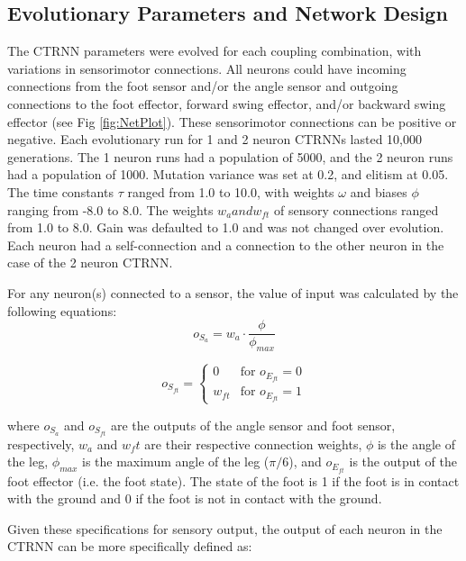 \documentclass{article}
\begin{document}
\subsection{Evolutionary Parameters and Network Design} The CTRNN parameters were evolved for each coupling combination, with variations in sensorimotor connections. All neurons could have incoming connections from the foot sensor and/or the angle sensor and outgoing connections to the foot effector, forward swing effector, and/or backward swing effector (see Fig \ref{fig:NetPlot}). These sensorimotor connections can be positive or negative. 
Each evolutionary run for 1 and 2 neuron CTRNNs lasted 10,000 generations. The 1 neuron runs had a population of 5000, and the 2 neuron runs had a population of 1000. Mutation variance was set at 0.2, and elitism at 0.05. The time constants \(\tau\) ranged from 1.0 to 10.0, with weights \(\omega\) and biases \(\phi\) ranging from -8.0 to 8.0. The weights \(w_a and w_{ft}\) of sensory connections ranged from 1.0 to 8.0. Gain was defaulted to 1.0 and was not changed over evolution. Each neuron had a self-connection and a connection to the other neuron in the case of the 2 neuron CTRNN.




For any neuron(s) connected to a sensor, the value of input was calculated by the following equations:
\begin{equation}
o_{S_{a}} = w_a \cdot \frac{ \phi  }{ \phi_{max} }
\end{equation}

\begin{equation}
o_{S_{ft}} = 
\begin{cases} 
0 & \text{for } o_{{E}_{ft}} = 0 \\
w_{ft} & \text{for } o_{{E}_{ft}} = 1
\end{cases}
\end{equation}

where \(o_{S_{a}}\) and \(o_{S_{ft}}\) are the outputs of the angle sensor and foot sensor, respectively, \(w_a\) and \(w_ft\) are their respective connection weights, \(\phi\) is the angle of the leg, \(\phi_{max}\) is the maximum angle of the leg (\(\pi/6\)), and \(o_{{E}_{ft}}\) is the output of the foot effector (i.e. the foot state). The state of the foot is 1 if the foot is in contact with the ground and 0 if the foot is not in contact with the ground.

Given these specifications for sensory output, the output of each neuron in the CTRNN can be more specifically defined as:
\end{document}
